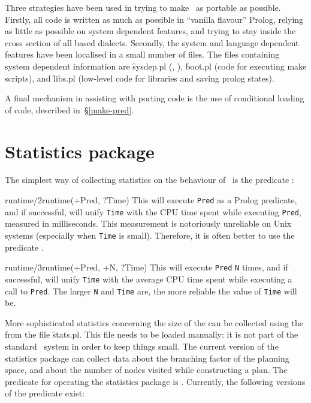 Three strategies have been used in trying to make \clam\ as portable
as possible. Firstly, all code is written as much as possible in
``vanilla flavour'' Prolog, relying as little as possible on system
dependent features, and trying to stay inside the cross section of all
{\sc {}} based dialects. Secondly, the system and language
dependent features have been localised in a small number of files. The
files containing system dependent information are \f{sysdep.pl}
(, ), \f{boot.pl} (code for executing make
scripts), and \f{libs.pl} (low-level code for libraries and saving prolog
states).

\iffalse
, and \f{swi} (code for running \clam\ under \inx {SWI
Prolog}).
\fi

A final mechanism in assisting with porting code is the use of
conditional loading of code, described in~\S\ref{make-pred}.


\section {Statistics package}

The simplest way of collecting statistics on the behaviour of \clam\ is
the predicate :

\begin{predicate}{runtime/2}{runtime(+Pred, ?Time)}%
This will execute {\tt Pred} as a Prolog predicate, and if
successful, will unify {\tt Time} with the CPU time spent 
while executing {\tt Pred}, measured in milliseconds. This measurement
is notoriously unreliable on Unix systems (especially when {\tt Time}
is small). Therefore, it is often better to use the predicate .
\end{predicate}

\begin{predicate}{runtime/3}{runtime(+Pred, +N, ?Time)}%
This will execute {\tt Pred} {\tt N} times, and if successful, will
unify {\tt Time} with the average CPU time spent while executing a
call to {\tt Pred}. The larger {\tt N} and {\tt Time} are, the more
reliable the value of {\tt Time} will be.
\end{predicate}

More sophisticated statistics concerning the size of the 
can be collected using the  from the file \f{stats.pl}.
This file needs to be loaded manually: it is not part of the standard
\clam\ system in order to keep things small. The current version of the
statistics package can collect data about the branching factor of the
planning space, and about the number of nodes visited while
constructing a plan. The predicate for operating the statistics package
is . Currently, the following versions of the
 predicate exist:

